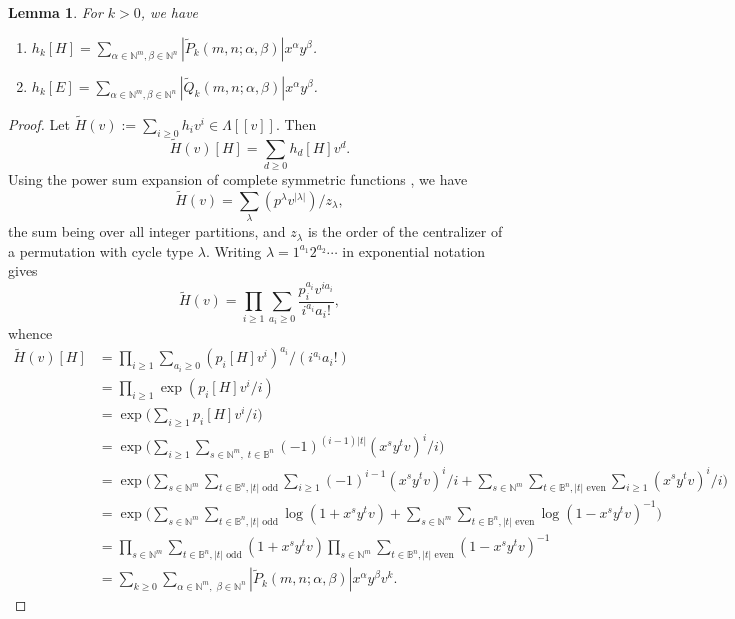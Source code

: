 \documentclass[12pt,reqno]{amsart}
\newtheorem{lemma}[theorem]{Lemma}
\theoremstyle{definition}
\theoremstyle{remark}
\begin{document}
\begin{lemma}\label{superIdentity}For $k>0$, we have
    \begin{enumerate}
        \item     $h_{k}[H]=\sum_{{\alpha\in\mathbb{N}^{m}, \beta\in\mathbb{N}^{n}}}|\tilde{P}_{k}(m,n;\alpha,\beta)|x^{\alpha}y^{\beta}$.
        \item     $h_{k}[E]=\sum_{{\alpha\in\mathbb{N}^{m}, \beta\in\mathbb{N}^{n}}}|\tilde{Q}_{k}(m,n;\alpha,\beta)|x^{\alpha}y^{\beta}$.
    \end{enumerate}
\end{lemma}
\begin{proof}
Let $\tilde H(v):=\sum_{i\geq 0}h_i v^{i}\in \Lambda[[v]]$. Then
\begin{equation}\label{superH}
    \tilde{H}(v)[H] = \sum_{d\geq 0}h_{d}[H]v^{d}.
\end{equation}
 Using the power sum expansion of complete symmetric functions \cite[Equation~2.14]{macdonald1998symmetric}, we have
\begin{displaymath}
    \tilde H (v) = \sum_\lambda (p^\lambda v^{|\lambda|})/z_\lambda,
\end{displaymath}
the sum being over all integer partitions, and $z_\lambda$ is the order of the centralizer of a permutation with cycle type $\lambda$.
Writing $\lambda=1^{a_1}2^{a_2}\dotsb$ in exponential notation gives
\begin{displaymath}
    \tilde H (v) = \prod_{i\geq 1}\sum_{a_i\geq 0} \frac{p_i^{a_i}v^{ia_{i}}}{i^{a_i}a_i!},
\end{displaymath}
whence
\begin{align*}
    \tilde H (v)[H] & = \prod_{i\geq 1}\sum_{a_i\geq 0} (p_i[H]v^{i})^{a_i} /(i^{a_i}a_i!)\\
    & = \prod_{i\geq 1}\exp (p_i[H] v^{i}/i)\\
    & = \exp\big(\sum_{i\geq 1} p_i[H] v^{i}/i\big)\\
    & = \exp\big(\sum_{i\geq 1} \sum_{s\in \mathbb N^m,\;t\in \mathbb B^n} (-1)^{(i-1)|t|}(x^s y^t v)^i/i\big)\\
    & = \exp\big(\sum_{s\in \mathbb N^m}\sum_{t\in \mathbb  B^n, |t| \text{ odd}}\sum_{i\geq 1}(-1)^{i-1}(x^s y^t v)^i/i + \sum_{s\in \mathbb N^m}\sum_{t\in \mathbb  B^n, |t| \text{ even}}\sum_{i\geq 1}(x^s y^t v)^i/i\big)\\
    & = \exp\big(\sum_{s\in \mathbb N^m}\sum_{t\in \mathbb  B^n, |t| \text{ odd}} \log(1+x^sy^t v)+\sum_{s\in \mathbb N^m}\sum_{t\in \mathbb  B^n, |t| \text{ even}}\log(1-x^sy^t v)^{-1}\big)\\
    & = \prod_{s\in \mathbb N^m}\sum_{t\in \mathbb  B^n, |t| \text{ odd}}(1+x^sy^t v)\prod_{s\in \mathbb N^m}\sum_{t\in \mathbb  B^n, |t| \text{ even}}(1-x^sy^t v)^{-1}\\
    & = \sum_{k\geq 0}\sum_{\alpha\in \mathbb N^m,\;\beta\in \mathbb N^n}|\tilde P_k(m,n;\alpha,\beta)|x^\alpha y^\beta v^{k}.
\end{align*}

\end{proof}
\end{document}

